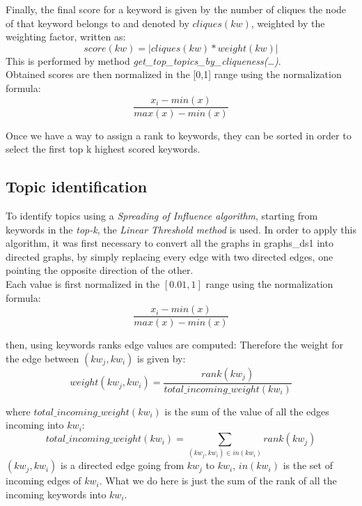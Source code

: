 \documentclass{article}
\begin{document}
Finally, the final score for a keyword is given by the number of cliques the node of that keyword belongs to and denoted by $cliques(kw)$, weighted by the weighting factor, written as:
\begin{equation}
	score(kw) = |cliques(kw)*weight(kw)|
\end{equation}
This is performed by method \textit{get\_top\_topics\_by\_cliqueness(\dots)}.\\
Obtained scores are then normalized in the [0,1] range using the normalization formula:
\begin{equation}
	\frac{x_i - min(x)}{max(x)-min(x)}
\end{equation}

Once we have a way to assign a rank to keywords, they can be sorted in order to select the first top k highest scored keywords.

\subsection{Topic identification}
To identify topics using a \textit{Spreading of Influence algorithm}, starting from keywords in the \textit{top-k}, the \textit{Linear Threshold method} is used.
In order to apply this algorithm, it was first necessary to convert all the graphs in graphs\_ds1 into directed graphs, by simply replacing every edge with two directed edges, one pointing the opposite direction of the other.\\
Each value is first normalized in the $[0.01, 1]$ range using the normalization formula:
\begin{equation}
	\frac{x_i - min(x)}{max(x)-min(x)}
\end{equation}

then, using keywords ranks edge values are computed:
Therefore the weight for the edge between $(kw_j, kw_i)$ is given by:
\begin{equation}
	weight(kw_j,kw_i) = \frac{rank(kw_j)}{total\_incoming\_weight(kw_i)}
\end{equation}

where $total\_incoming\_weight(kw_i)$ is the sum of the value of all the edges incoming into $kw_i$:
\begin{equation}
	total\_incoming\_weight(kw_i) = \sum_{(kw_j, kw_i) \in in(kw_i)} rank(kw_j)
\end{equation}
$(kw_j, kw_i)$ is a directed edge going from $kw_j$ to $kw_i$, $in(kw_i)$ is the set of incoming edges of $kw_i$. What we do here is just the sum of the rank of all the incoming keywords into $kw_i$.
\end{document}
